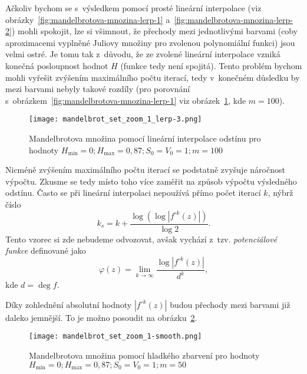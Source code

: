 Ačkoliv bychom se s~výsledkem pomocí prosté lineární interpolace (viz obrázky~\ref{fig:mandelbrotova-mnozina-lerp-1} a~\ref{fig:mandelbrotova-mnozina-lerp-2}) mohli spokojit, lze si všimnout, že přechody mezi jednotlivými barvami (coby aproximacemi vyplněné Juliovy množiny pro zvolenou polynomiální funkci) jsou velmi ostré. Je tomu tak z~důvodu, že ze zvolené lineární interpolace vzniká konečná posloupnost hodnot $H$ (funkce tedy není spojitá). Tento problém bychom mohli vyřešit zvýšením maximálního počtu iterací, tedy v~konečném důsledku by mezi barvami nebyly takové rozdíly (pro porovnání s~obrázkem~\ref{fig:mandelbrotova-mnozina-lerp-1} viz obrázek~\ref{fig:mandelbrotova-mnozina-lerp-3}, kde $m=100$).
\begin{figure}[h]
    \centering
    \texttt{[image: mandelbrot\_set\_zoom\_1\_lerp-3.png]}
    \caption{Mandelbrotova množina pomocí lineární interpolace odstínu pro hodnoty $H_{\text{min}}=0;H_{\text{max}}=0{,}87;S_0=V_0=1;m=100$}
    \label{fig:mandelbrotova-mnozina-lerp-3}
\end{figure}
Nicméně zvýšením maximálního počtu iterací se podstatně zvyšuje náročnost výpočtu. Zkusme se tedy místo toho více zaměřit na způsob výpočtu výsledného odstínu. Často se při lineární interpolaci nepoužívá přímo počet iterací $k$, nýbrž číslo
\[k_s=k+\dfrac{\log(\log|f^{\circ k}(z)|)}{\log{2}}.\]
Tento vzorec si zde nebudeme odvozovat, avšak vychází z~tzv. \emph{potenciálové funkce} definované jako
\[\varphi(z)=\lim_{k\to \infty }{\frac {\log|f^{\circ k}(z)|}{d^{k}}},\]
kde $d=\deg{f}$.

Díky zohlednění absolutní hodnoty $|f^{\circ k}(z)|$ budou přechody mezi barvami již daleko jemnější. To je možno posoudit na obrázku~\ref{fig:mandelbrotova-mnozina-smooth}.
\begin{figure}[h]
    \centering
    \texttt{[image: mandelbrot\_set\_zoom\_1-smooth.png]}
    \caption{Mandelbrotova množina pomocí hladkého zbarvení pro hodnoty $H_{\text{min}}=0;H_{\text{max}}=0{,}87;S_0=V_0=1;m=50$}
    \label{fig:mandelbrotova-mnozina-smooth}
\end{figure}